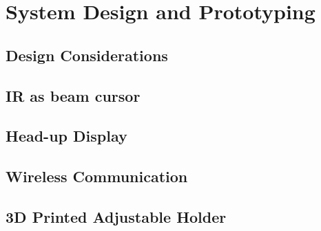 \section{System Design and Prototyping}
\label{sec:syst-design-prot}

\subsection{Design Considerations}
\label{sec:design-cons}

\subsection{IR as beam cursor}
\label{sec:ir-as-beam}

\subsection{Head-up Display}
\label{sec:head-up-display}

\subsection{Wireless Communication}
\label{sec:wirel-comm}

\subsection{3D Printed Adjustable Holder}
\label{sec:3d-print-adjust}





